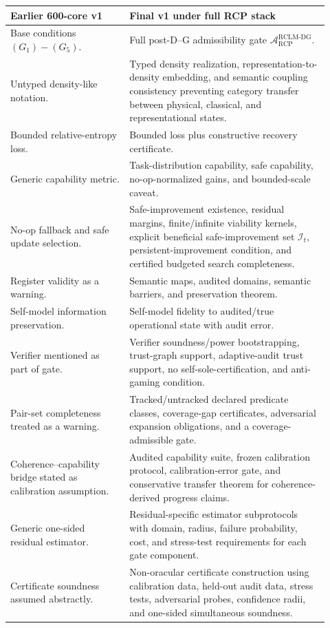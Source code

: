 \documentclass[11pt,a4paper]{article}
\newcommand{\Acal}{\mathcal A}
\newcommand{\RCP}{\mathrm{RCP}}
\newcommand{\RCLM}{\mathrm{RCLM}}
\newcommand{\DG}{\mathrm{DG}}
\begin{document}
\begin{longtable}{p{0.34\linewidth}p{0.58\linewidth}}
\toprule
\textbf{Earlier 600-core v1} & \textbf{Final v1 under full RCP stack}\\
\midrule
Base conditions \((G_1)-(G_5)\). & Full post-D--G admissibility gate \(\Acal_{\RCP}^{\RCLM\text{-}\DG}\).\\
Untyped density-like notation. & Typed density realization, representation-to-density embedding, and semantic coupling consistency preventing category transfer between physical, classical, and representational states.\\
Bounded relative-entropy loss. & Bounded loss plus constructive recovery certificate.\\
Generic capability metric. & Task-distribution capability, safe capability, no-op-normalized gains, and bounded-scale caveat.\\
No-op fallback and safe update selection. & Safe-improvement existence, residual margins, finite/infinite viability kernels, explicit beneficial safe-improvement set \(\mathcal I_t\), persistent-improvement condition, and certified budgeted search completeness.\\
Register validity as a warning. & Semantic maps, audited domains, semantic barriers, and preservation theorem.\\
Self-model information preservation. & Self-model fidelity to audited/true operational state with audit error.\\
Verifier mentioned as part of gate. & Verifier soundness/power bootstrapping, trust-graph support, adaptive-audit trust support, no self-sole-certification, and anti-gaming condition.\\
Pair-set completeness treated as a warning. & Tracked/untracked declared predicate classes, coverage-gap certificates, adversarial expansion obligations, and a coverage-admissible gate.\\
Coherence--capability bridge stated as calibration assumption. & Audited capability suite, frozen calibration protocol, calibration-error gate, and conservative transfer theorem for coherence-derived progress claims.\\
Generic one-sided residual estimator. & Residual-specific estimator subprotocols with domain, radius, failure probability, cost, and stress-test requirements for each gate component.\\
Certificate soundness assumed abstractly. & Non-oracular certificate construction using calibration data, held-out audit data, stress tests, adversarial probes, confidence radii, and one-sided simultaneous soundness.\\

\end{longtable}
\end{document}
